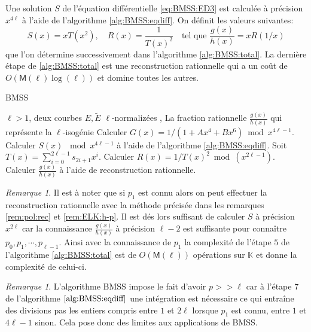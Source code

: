 \documentclass[10pt,a4paper]{book}
\theoremstyle{plain}
\theoremstyle{definition}
\theoremstyle{definition}
\theoremstyle{definition}
\theoremstyle{definition}
\theoremstyle{remark}
\newtheorem{rem}[thm]{Remarque}
\theoremstyle{remark}
\theoremstyle{definition}
\begin{document}
Une solution $S$ de l'équation différentielle \eqref{eq:BMSS:ED3} est calculée à précision $x^{4\ell}$ à l'aide de l'algorithme \ref{alg:BMSS:eqdiff}. On définit les valeurs suivantes:
\begin{equation}
S(x)=xT(x^2), \quad R(x)=\frac{1}{T(x)^2} \quad \text{tel que } \frac{g(x)}{h(x)}=xR(1/x)
\end{equation}
que l'on détermine successivement dans l'algorithme \ref{alg:BMSS:total}. La dernière étape de \ref{alg:BMSS:total} est une reconstruction rationnelle qui a un coût de $O(\mathsf{M}(\ell)\log(\ell))$ \cite[11]{vzGJG03} et domine toutes les autres.

\begin{algorithm}
\caption{\label{alg:BMSS:total} BMSS}
\begin{algorithmic}[1]
\REQUIRE $\ell>1$, deux courbes $E,\tilde{E}$ $\ell$-normalizées  ,%
\ENSURE La fraction rationnelle $\frac{g(x)}{h(x)}$ qui représente la $\ell$-isogénie
\STATE Calculer $G(x)=1/(1+Ax^4+Bx^6) \bmod x^{4\ell-1}$.
\STATE Calculer $S(x)$ $\bmod x^{4\ell-1}$ à l'aide de l'algorithme \ref{alg:BMSS:eqdiff}.
\STATE Soit $T(x)=\sum_{i=0}^{2\ell-1}s_{2i+1}x^i$.
\STATE Calculer $R(x)=1/T(x)^2 \bmod(x^{2\ell-1})$.
\STATE Calculer $\frac{g(x)}{h(x)}$ à l'aide de reconstruction rationnelle. 
\end{algorithmic}
\end{algorithm}

\begin{rem}
Il est à noter que si $p_1$ est connu alors on peut effectuer la reconstruction rationnelle avec la méthode  précisée dans les remarques \ref{rem:pol:rec} et \ref{rem:ELK:h-p}. Il est dés lors suffisant de calculer $S$ à précision $x^{2\ell}$ car la connaissance $\frac{g(x)}{h(x)}$ à précision $\ell-2$ est suffisante pour connaître $p_0,p_1,\cdots ,p_{\ell-1}$. Ainsi avec la connaissance de $p_1$ la complexité de l'étape $5$ de l'algorithme \ref{alg:BMSS:total} est de $O(\mathsf{M}(\ell))$ opérations sur $\mathbb{K}$ et donne la complexité de celui-ci.
\end{rem}

\begin{rem}
L'algorithme BMSS impose le fait d'avoir $p>>\ell$ car à l'étape $7$ de l'algorithme $\ref{alg:BMSS:eqdiff}$ une intégration est nécessaire ce qui entraîne des divisions pas les entiers compris entre $1$ et $2\ell$ lorsque $p_1$ est connu, entre $1$ et $4\ell-1$ sinon. Cela pose donc des limites aux applications de BMSS.
\end{rem}
\end{document}
